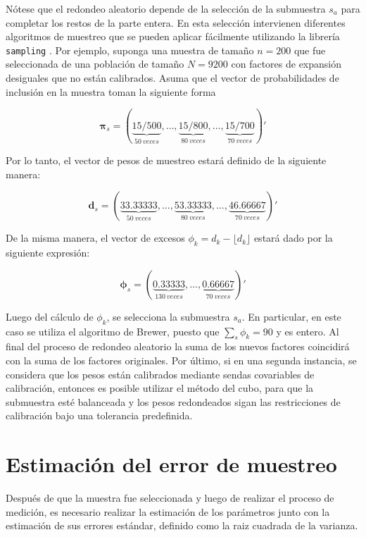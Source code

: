 \documentclass[
  12pt,
  spanish,
]{book}
\begin{document}
Nótese que el redondeo aleatorio depende de la selección de la submuestra \(s_a\) para completar los restos de la parte entera. En esta selección intervienen diferentes algoritmos de muestreo que se pueden aplicar fácilmente utilizando la librería \texttt{sampling} \citep{Matei}. Por ejemplo, suponga una muestra de tamaño \(n= 200\) que fue seleccionada de una población de tamaño \(N=9200\) con factores de expansión desiguales que no están calibrados. Asuma que el vector de probabilidades de inclusión en la muestra toman la siguiente forma

\[
\boldsymbol{\pi}_s = (\underbrace{15/500}_{50 \ veces},
\ldots,
\underbrace{15/800}_{80 \ veces}, 
\ldots,
\underbrace{15/700}_{70 \ veces})'
\]

Por lo tanto, el vector de pesos de muestreo estará definido de la siguiente manera:

\[
\mathbf{d}_s = (\underbrace{33.33333}_{50 \ veces},
\ldots,
\underbrace{53.33333}_{80 \ veces}, 
\ldots,
\underbrace{46.66667}_{70 \ veces})'
\]

De la misma manera, el vector de excesos \(\phi_k = d_k - \lfloor d_k \rfloor\) estará dado por la siguiente expresión:

\[
\boldsymbol{\phi}_s = (\underbrace{0.33333}_{130 \ veces},
\ldots,
\underbrace{0.66667}_{70 \ veces})'
\]

Luego del cálculo de \(\phi_k\), se selecciona la submuestra \(s_a\). En particular, en este caso se utiliza el algoritmo de Brewer, puesto que \(\sum_s\phi_k = 90\) y es entero. Al final del proceso de redondeo aleatorio la suma de los nuevos factores coincidirá con la suma de los factores originales. Por último, si en una segunda instancia, se considera que los pesos están calibrados mediante sendas covariables de calibración, entonces es posible utilizar el método del cubo, para que la submuestra esté balanceada y los pesos redondeados sigan las restricciones de calibración bajo una tolerancia predefinida.

\hypertarget{estimaciuxf3n-del-error-de-muestreo}{%
\chapter{Estimación del error de muestreo}\label{estimaciuxf3n-del-error-de-muestreo}}

Después de que la muestra fue seleccionada y luego de realizar el proceso de medición, es necesario realizar la estimación de los parámetros junto con la estimación de sus errores estándar, definido como la raiz cuadrada de la varianza.
\end{document}
